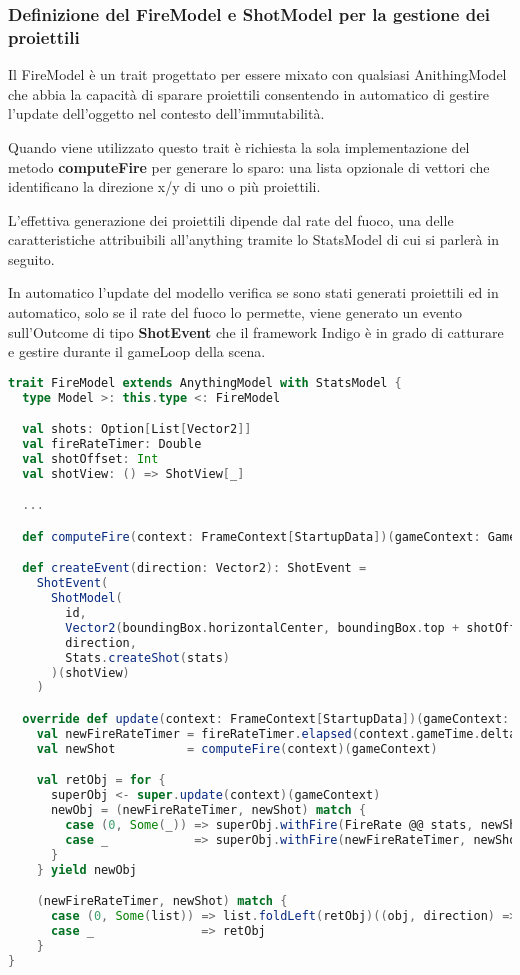 \subsubsection{Definizione del FireModel e ShotModel per la gestione dei proiettili}
Il FireModel è un trait progettato per essere mixato con qualsiasi AnithingModel
che abbia la capacità di sparare proiettili consentendo in automatico di gestire l'update dell'oggetto nel contesto dell'immutabilità.

Quando viene utilizzato questo trait è richiesta la sola implementazione del metodo \textbf{computeFire} per generare lo sparo: 
una lista opzionale di vettori che identificano la direzione x/y di uno o più proiettili. 

L'effettiva generazione dei proiettili dipende dal rate del fuoco, 
una delle caratteristiche attribuibili all'anything tramite lo StatsModel di cui si parlerà in seguito.

In automatico l'update del modello verifica se sono stati generati proiettili ed in automatico, 
solo se il rate del fuoco lo permette, viene generato un evento sull'Outcome di tipo \textbf{ShotEvent}
che il framework Indigo è in grado di catturare e gestire durante il gameLoop della scena.

\begin{lstlisting}[language=Scala]
trait FireModel extends AnythingModel with StatsModel {
  type Model >: this.type <: FireModel

  val shots: Option[List[Vector2]]
  val fireRateTimer: Double
  val shotOffset: Int
  val shotView: () => ShotView[_]

  ...

  def computeFire(context: FrameContext[StartupData])(gameContext: GameContext): Option[List[Vector2]]

  def createEvent(direction: Vector2): ShotEvent =
    ShotEvent(
      ShotModel(
        id,
        Vector2(boundingBox.horizontalCenter, boundingBox.top + shotOffset),
        direction,
        Stats.createShot(stats)
      )(shotView)
    )

  override def update(context: FrameContext[StartupData])(gameContext: GameContext): Outcome[Model] =
    val newFireRateTimer = fireRateTimer.elapsed(context.gameTime.delta.toDouble)
    val newShot          = computeFire(context)(gameContext)

    val retObj = for {
      superObj <- super.update(context)(gameContext)
      newObj = (newFireRateTimer, newShot) match {
        case (0, Some(_)) => superObj.withFire(FireRate @@ stats, newShot).asInstanceOf[Model]
        case _            => superObj.withFire(newFireRateTimer, newShot).asInstanceOf[Model]
      }
    } yield newObj

    (newFireRateTimer, newShot) match {
      case (0, Some(list)) => list.foldLeft(retObj)((obj, direction) => obj.addGlobalEvents(createEvent(direction)))
      case _               => retObj
    }
}
\end{lstlisting}

